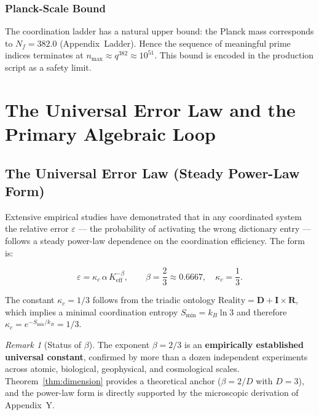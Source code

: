 \documentclass[12pt,a4paper]{article}
\theoremstyle{remark}
\newtheorem{remark}[theorem]{Remark}
\begin{document}
	\subsubsection{Planck-Scale Bound}
	
	The coordination ladder has a natural upper bound: the Planck mass corresponds
	to \(N_f = 382.0\) (Appendix~Ladder).  Hence the sequence of meaningful prime
	indices terminates at \(n_{\max} \approx q^{382} \approx 10^{51}\).  This bound
	is encoded in the production script as a safety limit.
	
	\section{The Universal Error Law and the Primary Algebraic Loop}
	\label{sec:error-law}
	
	\subsection{The Universal Error Law (Steady Power-Law Form)}
	
	Extensive empirical studies \cite{AppendixL, AppendixFerra} have demonstrated
	that in any coordinated system the relative error \(\varepsilon\) --- the
	probability of activating the wrong dictionary entry --- follows a steady
	power-law dependence on the coordination efficiency.  The form is:
	
	\begin{equation}
		\boxed{\varepsilon = \kappa_c \, \alpha \, K_{\mathrm{eff}}^{-\beta}, \qquad
			\beta = \frac{2}{3} \approx 0.6667,\quad \kappa_c = \frac{1}{3}}.
		\label{eq:error-law-corrected}
	\end{equation}
	
	The constant \(\kappa_c = 1/3\) follows from the triadic ontology
	\(\text{Reality} = \mathbf{D} + \mathbf{I} \times \mathbf{R}\), which implies
	a minimal coordination entropy \(S_{\min} = k_B \ln 3\) and therefore
	\(\kappa_c = e^{-S_{\min}/k_B} = 1/3\).
	
	\begin{remark}[Status of \(\beta\)]
		The exponent \(\beta = 2/3\) is an \textbf{empirically established universal
			constant}, confirmed by more than a dozen independent experiments across
		atomic, biological, geophysical, and cosmological scales.  Theorem~\ref{thm:dimension}
		provides a theoretical anchor (\(\beta = 2/D\) with \(D=3\)), and the
		power-law form is directly supported by the microscopic derivation of
		Appendix~Y.
	\end{remark}
	
\end{document}

